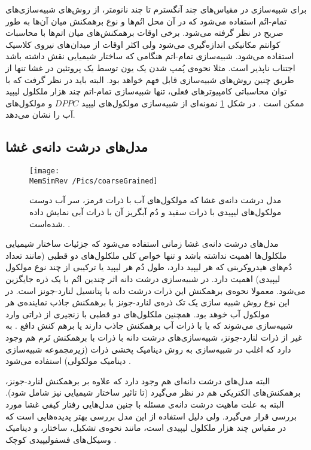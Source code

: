 برای شبیه‌سازی در مقیاس‌های چند آنگسترم تا چند نانومتر، از روش‌های شبیه‌سازی‌های تمام-اتُم
استفاده می‌شود که در آن محل اتُم‌ها و نوع برهمکنش‌ میان آن‌ها به طور صریح در نظر گرفته می‌شود. برخی اوقات برهمکنش‌های میان اتم‌ها با محاسبات کوانتم مکانیکی اندازه‌گیری می‌شود ولی اکثر اوقات از میدان‌های نیروی کلاسیک استفاده می‌شود. شبیه‌سازی تمام-اتم هنگامی که ساختار شیمیایی نقش داشته باشد اجتناب ناپذیر است. مثلا نحوه‌ی پُمپ شدن یک یون توسط یک پروتئین در غشا تنها از طریق چنین روش‌های شبیه‌سازی قابل فهم خواهد بود. البته باید در نظر گرفت که با توان محاسباتی کامپیوتر‌های فعلی، تنها شبیه‌سازی تمام-اتم چند هزار ملکلول لیپید ممکن است . در شکل 
\ref{fig:allAtom}
نمونه‌ای از شبیه‌سازی مولکول‌های لیپید
$DPPC$
و مولکول‌های آب را نشان می‌دهد. 



 \subsection{
 مدل‌های درشت دانه‌ی غشا
 }
 \begin{figure}[h]
\begin{center}
\texttt{[image: \\MemSimRev /Pics/coarseGrained]}
\caption{
مدل درشت دانه‌ی غشا که مولکول‌های آب با ذرات قرمز، سر آب دوست مولکول‌های لیپیدی با ذرات سفید و دُم آبگریز آن با ذرات آبی نمایش داده شده‌است.
\cite{AlGhoul2004}.
}
\label{fig:allAtom}
\end{center}
\end{figure}
 مدل‌های درشت دانه‌ی غشا
زمانی استفاده می‌شود که جزئیات ساختار شیمیایی ملکلول‌ها اهمیت نداشته باشد و تنها خواص کلی ملکلول‌های دو قطبی (مانند تعداد دُم‌های هیدروکربنی که هر لیپید دارد، طول دُم هر لیپید یا ترکیبی از چند نوع مولکول لیپیدی) اهمیت دارد. در شبیه‌سازی درشت‌ دانه اثر چندین اتُم با یک ذره‌ جایگزین می‌شود. معمولا نحوه‌ی برهمکنش این ذرات درشت دانه با پتانسیل لنارد-جونز
است. در این نوع روش شبیه‌ سازی یک تک ذره‌ی لنارد-جونز با برهمکنش جاذب نماینده‌ی هر مولکول آب خوهد بود. همچنین ملکلو‌ل‌های دو قطبی با زنجیری از ذراتی وارد شبیه‌سازی می‌شوند که یا با ذرات آب برهمکنش جاذب دارند یا برهم کنش دافع
\cite{Goetz1998, Goetz1999, Otter2003}.
به غیر از ذرات لنارد-جونز، شبیه‌سازی‌های درشت دانه با ذرات با برهمکنش نَرم هم وجود دارد که اغلب در شبیه‌سازی به روش دینامیک پخشی ذرات
(زیرمجموعه شبیه‌سازی دینامیک مولکولی) استفاده می‌شود
\cite{Shillcock2002, Laradji2004PRL, Ortiz2005}.


البته مدل‌های درشت‌ دانه‌ای هم وجود دارد که علاوه بر برهمکنش لنارد-جونز، برهمکنش‌های الکتریکی هم در نظر می‌گیرد
\cite{Marrink2003, Marrink2007}
 (تا تاثیر ساختار شیمیایی نیز شامل شود). البته به علت ماهیت درشت دانه‌ی مسئله با چنین مدل‌هایی رفتار کیفی غشا مورد بررسی قرار می‌گیرد. ولی دلیل استفاده از این مدل بررسی بهتر پدیده‌هایی است که در مقیاس چند هزار ملکلول لیپیدی است، مانند نحوه‌ی تشکیل، ساختار، و دینامیک وسیکل‌های فسفولیپیدی کوچک
 \cite{Marrink2003,Marrink2009}.
